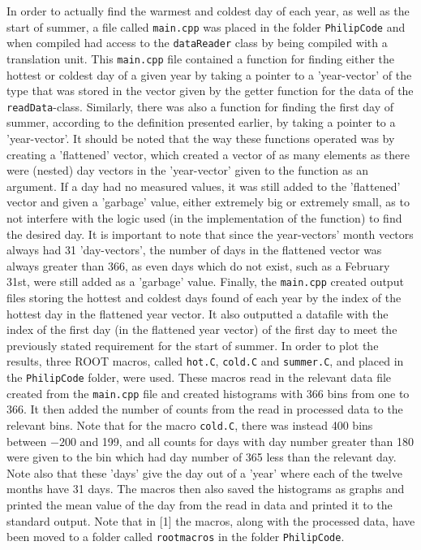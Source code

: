 \documentclass[a4, 12pt]{article}
\begin{document}
\indent In order to actually find the warmest and coldest day of each year, as well as the start of summer, a file called \texttt{main.cpp} was placed in the folder \texttt{PhilipCode} and when compiled had access to the \texttt{dataReader} class by being compiled with a translation unit. This \texttt{main.cpp} file contained a function for finding either the hottest or coldest day of a given year by taking a pointer to a 'year-vector' of the type that was stored in the vector given by the getter function for the data of the \texttt{readData}-class. Similarly, there was also a function for finding the first day of summer, according to the definition presented earlier, by taking a pointer to a 'year-vector'. It should be noted that the way these functions operated was by creating a 'flattened' vector, which created a vector of as many elements as there were (nested) day vectors in the 'year-vector' given to the function as an argument. If a day had no measured values, it was still added to the 'flattened' vector and given a 'garbage' value, either extremely big or extremely small, as to not interfere with the logic used (in the implementation of the function) to find the desired day. It is important to note that since the year-vectors' month vectors always had 31 'day-vectors', the number of days in the flattened vector was always greater than 366, as even days which do not exist, such as a February 31st, were still added as a 'garbage' value. Finally, the \texttt{main.cpp} created output files storing the hottest and coldest days found of each year by the index of the hottest day in the flattened year vector. It also outputted a datafile with the index of the first day (in the flattened year vector) of the first day to meet the previously stated requirement for the start of summer. \newline \indent
In order to plot the results, three ROOT macros, called \texttt{hot.C}, \texttt{cold.C} and \texttt{summer.C}, and placed in the \texttt{PhilipCode} folder, were used. These macros read in the relevant data file created from the \texttt{main.cpp} file and created histograms with 366 bins from one to 366. It then added the number of counts from the read in processed data to the relevant bins. Note that for the macro \texttt{cold.C}, there was instead 400 bins between $-200$ and 199, and all counts for days with day number greater than 180 were given to the bin which had day number of 365 less than the relevant day. Note also that these 'days' give the day out of a 'year' where each of the twelve months have 31 days. The macros then also saved the histograms as graphs and printed the mean value of the day from the read in data and printed it to the standard output. Note that in [1] the macros, along with the processed data, have been moved to a folder called \texttt{rootmacros} in the folder \texttt{PhilipCode}.
\end{document}
